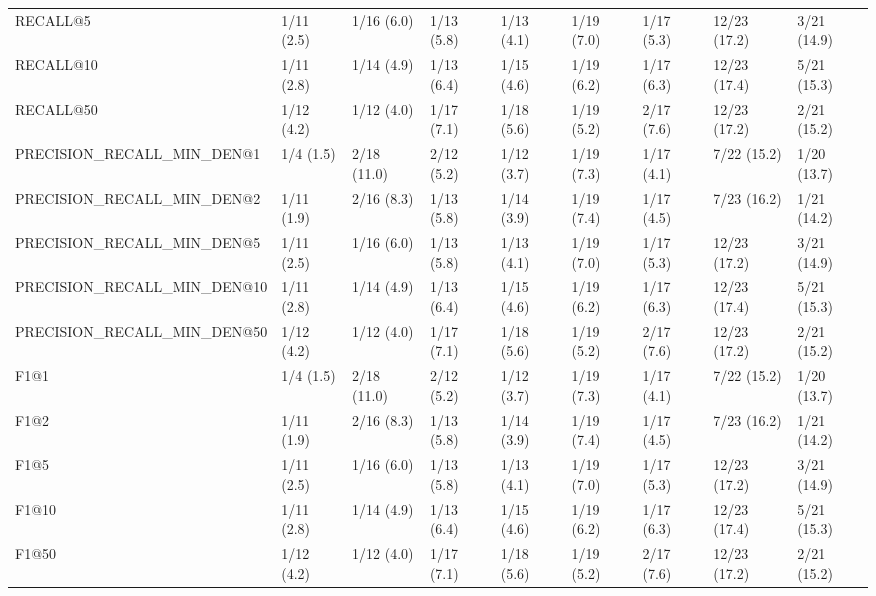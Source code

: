 \begin{tabular}{lllllllll}
RECALL@5                    &     1/11 (2.5) &     1/16 (6.0) &    1/13 (5.8) &    1/13 (4.1) &  1/19 (7.0) &   1/17 (5.3) &   12/23 (17.2) &        3/21 (14.9) \\
RECALL@10                   &     1/11 (2.8) &     1/14 (4.9) &    1/13 (6.4) &    1/15 (4.6) &  1/19 (6.2) &   1/17 (6.3) &   12/23 (17.4) &        5/21 (15.3) \\
RECALL@50                   &     1/12 (4.2) &     1/12 (4.0) &    1/17 (7.1) &    1/18 (5.6) &  1/19 (5.2) &   2/17 (7.6) &   12/23 (17.2) &        2/21 (15.2) \\
PRECISION_RECALL_MIN_DEN@1  &      1/4 (1.5) &    2/18 (11.0) &    2/12 (5.2) &    1/12 (3.7) &  1/19 (7.3) &   1/17 (4.1) &    7/22 (15.2) &        1/20 (13.7) \\
PRECISION_RECALL_MIN_DEN@2  &     1/11 (1.9) &     2/16 (8.3) &    1/13 (5.8) &    1/14 (3.9) &  1/19 (7.4) &   1/17 (4.5) &    7/23 (16.2) &        1/21 (14.2) \\
PRECISION_RECALL_MIN_DEN@5  &     1/11 (2.5) &     1/16 (6.0) &    1/13 (5.8) &    1/13 (4.1) &  1/19 (7.0) &   1/17 (5.3) &   12/23 (17.2) &        3/21 (14.9) \\
PRECISION_RECALL_MIN_DEN@10 &     1/11 (2.8) &     1/14 (4.9) &    1/13 (6.4) &    1/15 (4.6) &  1/19 (6.2) &   1/17 (6.3) &   12/23 (17.4) &        5/21 (15.3) \\
PRECISION_RECALL_MIN_DEN@50 &     1/12 (4.2) &     1/12 (4.0) &    1/17 (7.1) &    1/18 (5.6) &  1/19 (5.2) &   2/17 (7.6) &   12/23 (17.2) &        2/21 (15.2) \\
F1@1                        &      1/4 (1.5) &    2/18 (11.0) &    2/12 (5.2) &    1/12 (3.7) &  1/19 (7.3) &   1/17 (4.1) &    7/22 (15.2) &        1/20 (13.7) \\
F1@2                        &     1/11 (1.9) &     2/16 (8.3) &    1/13 (5.8) &    1/14 (3.9) &  1/19 (7.4) &   1/17 (4.5) &    7/23 (16.2) &        1/21 (14.2) \\
F1@5                        &     1/11 (2.5) &     1/16 (6.0) &    1/13 (5.8) &    1/13 (4.1) &  1/19 (7.0) &   1/17 (5.3) &   12/23 (17.2) &        3/21 (14.9) \\
F1@10                       &     1/11 (2.8) &     1/14 (4.9) &    1/13 (6.4) &    1/15 (4.6) &  1/19 (6.2) &   1/17 (6.3) &   12/23 (17.4) &        5/21 (15.3) \\
F1@50                       &     1/12 (4.2) &     1/12 (4.0) &    1/17 (7.1) &    1/18 (5.6) &  1/19 (5.2) &   2/17 (7.6) &   12/23 (17.2) &        2/21 (15.2) \\

\end{tabular}
